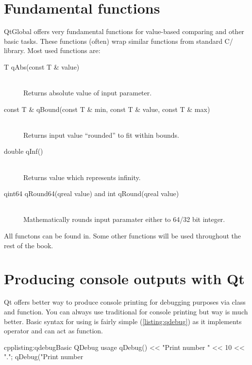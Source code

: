\section{Fundamental functions}
QtGlobal offers very fundamental functions for value-based comparing and other basic tasks. These functions (often) wrap similar functions from standard C/\cpp{} library. Most used functions are:
\begin{description}
\item[T qAbs(const T \& value)] \hfill \\
Returns absolute value of input parameter.
\item[const T \& qBound(const T \& min, const T \& value, const T \& max)] \hfill \\
Returns input value \enquote{rounded} to fit within bounds.
\item[double qInf()] \hfill \\
Returns value which represents infinity.
\item[qint64 qRound64(qreal value) and int qRound(qreal value)] \hfill \\
Mathematically rounds input paramater either to 64/32 bit integer.
\end{description}

All functons can be found in. Some other functions will be used throughout the rest of the book.

\section{Producing console outputs with Qt}
Qt offers better way to produce console printing for debugging purposes via  class and function. You can always use traditional for console printing but way is much better. Basic syntax for using is fairly simple (\autoref{listing:qdebug}) as it implements  operator and can act as  function.

\begin{fdoccode}{cpp}{listing:qdebug}{Basic QDebug usage}
qDebug() << "Print number " << 10 << ".\n";
qDebug("Print number %
\end{fdoccode}

